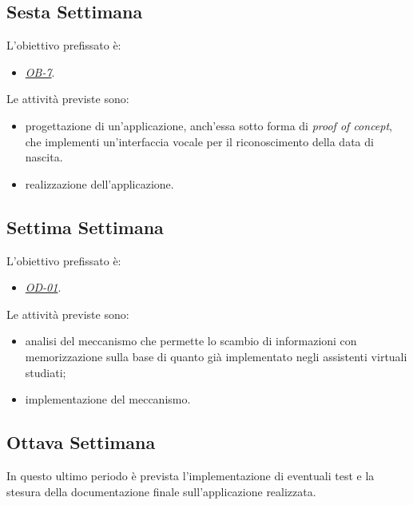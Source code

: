 	\subsection*{Sesta Settimana}
	L'obiettivo prefissato è:
	\begin{itemize}
		\item \textit{\underline{OB-7}}.
	\end{itemize}
	Le attività previste sono:
	\begin{itemize}
		\item progettazione di un'applicazione, anch'essa sotto forma di \textit{proof of concept}, che implementi un'interfaccia vocale per il riconoscimento della data di nascita.
		\item realizzazione dell'applicazione.
	\end{itemize}
	\subsection*{Settima Settimana}
	L'obiettivo prefissato è:
	\begin{itemize}
		\item \textit{\underline{OD-01}}.
	\end{itemize}
	Le attività previste sono:
	\begin{itemize}
		\item analisi del meccanismo che permette lo scambio di informazioni con memorizzazione sulla base di quanto già implementato negli assistenti virtuali studiati;
		\item implementazione del meccanismo.
	\end{itemize}
	\subsection*{Ottava Settimana}
	In questo ultimo periodo è prevista l'implementazione di eventuali test e la stesura della documentazione finale sull'applicazione realizzata.



